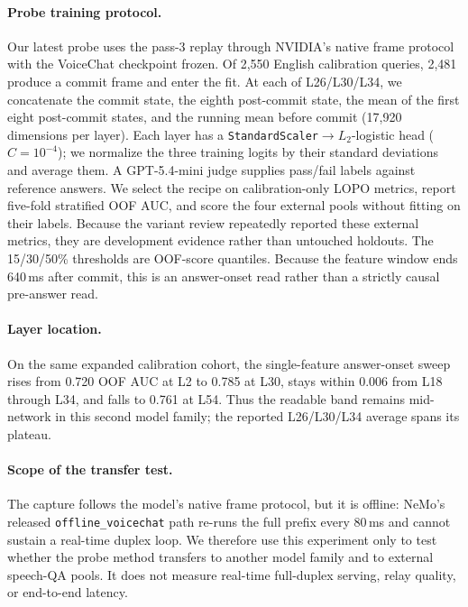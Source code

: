\paragraph{Probe training protocol.}
Our latest probe uses the pass-3 replay through NVIDIA's native frame
protocol with the VoiceChat checkpoint frozen.
Of 2{,}550 English calibration queries, 2{,}481 produce a commit frame
and enter the fit. At each of L26/L30/L34, we concatenate the commit
state, the eighth post-commit state, the mean of the first eight
post-commit states, and the running mean before commit (17{,}920
dimensions per layer). Each layer has a
\texttt{StandardScaler}$\to L_2$-logistic head ($C{=}10^{-4}$);
we normalize the three training logits by their standard deviations
and average them. A GPT-5.4-mini judge supplies pass/fail labels
against reference answers. We select the recipe on calibration-only
LOPO metrics, report five-fold stratified OOF AUC, and score the four
external pools without fitting on their labels. Because the variant
review repeatedly reported these external metrics, they are
development evidence rather than untouched holdouts. The 15/30/50\%
thresholds are OOF-score quantiles. Because the feature window ends
640\,ms after commit, this is an answer-onset read rather than a
strictly causal pre-answer read.

\paragraph{Layer location.}
On the same expanded calibration cohort, the single-feature
answer-onset sweep rises from 0.720 OOF AUC at L2 to 0.785 at L30,
stays within 0.006 from L18 through L34, and falls to 0.761 at L54.
Thus the readable band remains mid-network in this second model
family; the reported L26/L30/L34 average spans its plateau.

\paragraph{Scope of the transfer test.}
The capture follows the model's native frame protocol, but it is
offline: NeMo's released \texttt{offline\_voicechat} path re-runs the
full prefix every 80\,ms and cannot sustain a real-time duplex loop.
We therefore use this experiment only to test whether the probe
method transfers to another model family and to external speech-QA pools.
It does not measure real-time full-duplex serving, relay quality, or
end-to-end latency.

